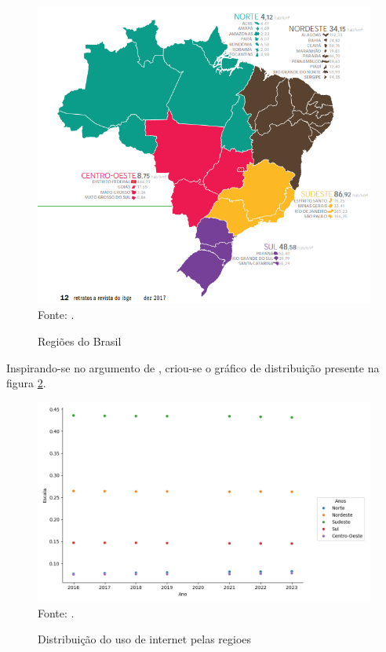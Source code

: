 \begin{figure}[H]
    \centering
    \caption{Regiões do Brasil}
    \includegraphics[width=0.75\linewidth]{figuras/regioes/regioes_brasil.PNG}
    \label{fig:regioes_brasil}
    \\ \footnotesize{Fonte: \cite{HAMAM_2017}.}
\end{figure}

Inspirando-se no argumento de \cite{HAMAM_2017}, criou-se o gráfico de distribuição presente na figura \ref{fig:distribuicao_uso_internet_regioes}.

\begin{figure}[H]
    \centering
    \caption{Distribuição do uso de internet pelas regioes}
    \includegraphics[width=1\linewidth]{figuras/internet/distribuicao_uso_internet_regioes.png}
    \label{fig:distribuicao_uso_internet_regioes}
    \footnotesize{Fonte: \cite{pnda_continua_anual_2016_2023}.}
\end{figure}


